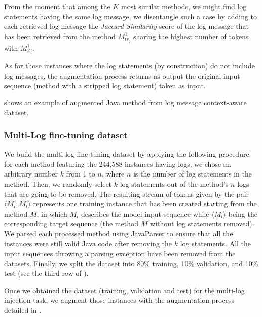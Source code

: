 From the moment that among the $K$ most similar methods, we might find log statements having the same log message, we disentangle such a case by adding to each retrieved log message the \textit{Jaccard Similarity} score of the log message that has been retrieved from the method $M_{tr_j}^{1}$ sharing the highest number of tokens with $M_{Z_i}^{1}$.

As for those instances where the log statements (by construction) do not include log messages, the augmentation process returns as output the original input sequence (\ie \java method with a stripped log statement) taken as input.


\figref{} shows an example of augmented Java method from log message context-aware dataset.



\subsubsection{Multi-Log fine-tuning dataset}

We build the multi-log fine-tuning dataset by applying the following procedure: for each method featuring the 244,588 instances having logs, we chose an arbitrary number $k$ from 1 to $n$, where $n$ is the number of log statements in the method. Then, we randomly select $k$ log statements out of the method's $n$ logs that are going to be removed. 
The resulting stream of tokens given by the pair $\langle M_i, M_t \rangle$ represents one training instance that has been created starting from the method $M$, in which $M_i$ describes the model input sequence while $\langle M_t \rangle$ being  the corresponding target sequence (\ie the method $M$ without log statements removed). 
We parsed each processed method using JavaParser \cite{javaparser} to ensure that all the instances were still valid Java code after removing the $k$ log statements. 
All the input sequences throwing a parsing exception have been removed from the datasets. Finally, we split the dataset into 80\% training, 10\% validation, and 10\% test (see the third row of ).

Once we obtained the dataset (\ie training, validation and test) for the multi-log injection task, we augment those instances with the augmentation process detailed in .

